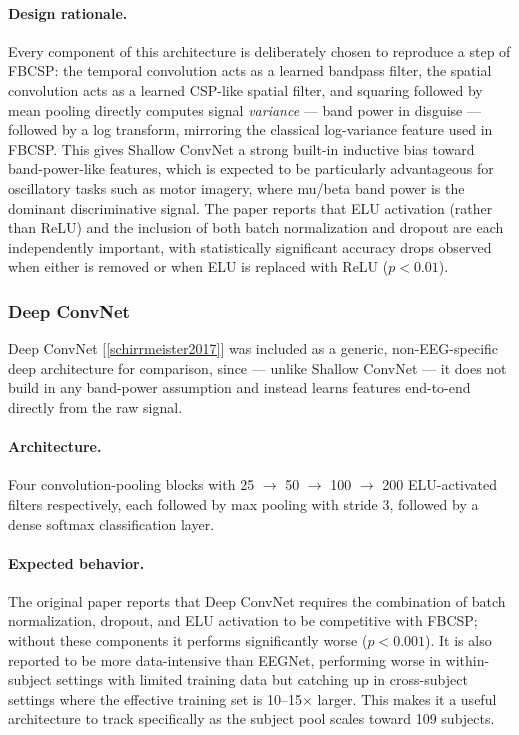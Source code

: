 \documentclass[11pt,a4paper]{article}
\renewcommand{\cite}[1]{[\ref{#1}]}
\begin{document}
\paragraph{Design rationale.} Every component of this architecture is deliberately chosen to reproduce a step of FBCSP: the temporal convolution acts as a learned bandpass filter, the spatial convolution acts as a learned CSP-like spatial filter, and squaring followed by mean pooling directly computes signal \emph{variance} --- band power in disguise --- followed by a log transform, mirroring the classical log-variance feature used in FBCSP. This gives Shallow ConvNet a strong built-in inductive bias toward band-power-like features, which is expected to be particularly advantageous for oscillatory tasks such as motor imagery, where mu/beta band power is the dominant discriminative signal. The paper reports that ELU activation (rather than ReLU) and the inclusion of both batch normalization and dropout are each independently important, with statistically significant accuracy drops observed when either is removed or when ELU is replaced with ReLU ($p<0.01$).

\subsubsection{Deep ConvNet}
Deep ConvNet \cite{schirrmeister2017} was included as a generic, non-EEG-specific deep architecture for comparison, since --- unlike Shallow ConvNet --- it does not build in any band-power assumption and instead learns features end-to-end directly from the raw signal.

\paragraph{Architecture.} Four convolution-pooling blocks with 25 $\rightarrow$ 50 $\rightarrow$ 100 $\rightarrow$ 200 ELU-activated filters respectively, each followed by max pooling with stride 3, followed by a dense softmax classification layer.

\paragraph{Expected behavior.} The original paper reports that Deep ConvNet requires the combination of batch normalization, dropout, and ELU activation to be competitive with FBCSP; without these components it performs significantly worse ($p<0.001$). It is also reported to be more data-intensive than EEGNet, performing worse in within-subject settings with limited training data but catching up in cross-subject settings where the effective training set is 10--15$\times$ larger. This makes it a useful architecture to track specifically as the subject pool scales toward 109 subjects.
\end{document}
